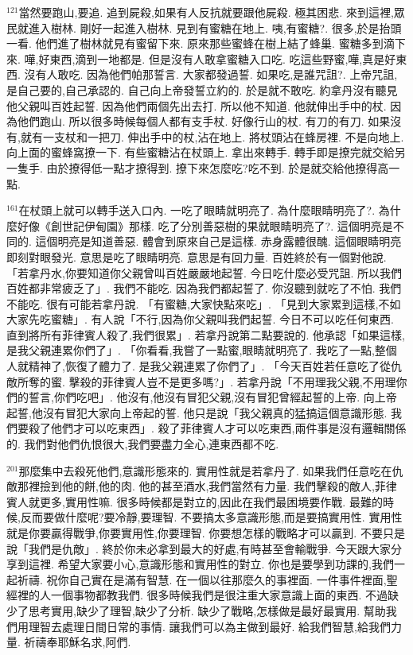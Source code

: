 \documentclass{book}
\begin{document}
$^{121}$當然要跑山,要追.
追到屍殺,如果有人反抗就要跟他屍殺.
極其困悲.
來到這裡,眾民就進入樹林.
剛好一起進入樹林.
見到有蜜糖在地上.
咦,有蜜糖?.
很多,於是抬頭一看.
他們進了樹林就見有蜜留下來.
原來那些蜜蜂在樹上結了蜂巢.
蜜糖多到滴下來.
嘩,好東西,滴到一地都是.
但是沒有人敢拿蜜糖入口吃.
吃這些野蜜,嘩,真是好東西.
沒有人敢吃.
因為他們帕那誓言.
大家都發過誓.
如果吃,是誰咒詛?.
上帝咒詛,是自己要的,自己承認的.
自己向上帝發誓立約的.
於是就不敢吃.
約拿丹沒有聽見他父親叫百姓起誓.
因為他們兩個先出去打.
所以他不知道.
他就伸出手中的杖.
因為他們跑山.
所以很多時候每個人都有支手杖.
好像行山的杖.
有刀的有刀.
如果沒有,就有一支杖和一把刀.
伸出手中的杖,沾在地上.
將杖頭沾在蜂房裡.
不是向地上.
向上面的蜜蜂窩撩一下.
有些蜜糖沾在杖頭上.
拿出來轉手.
轉手即是撩完就交給另一隻手.
由於撩得低一點才撩得到.
撩下來怎麼吃?吃不到.
於是就交給他撩得高一點.

$^{161}$在杖頭上就可以轉手送入口內.
一吃了眼睛就明亮了.
為什麼眼睛明亮了?.
為什麼好像《創世記伊甸園》那樣.
吃了分別善惡樹的果就眼睛明亮了?.
這個明亮是不同的.
這個明亮是知道善惡.
體會到原來自己是這樣.
赤身露體很醜.
這個眼睛明亮即刻對眼發光.
意思是吃了眼睛明亮.
意思是有回力量.
百姓終於有一個對他說.
「若拿丹水,你要知道你父親曾叫百姓嚴嚴地起誓.
今日吃什麼必受咒詛.
所以我們百姓都非常疲乏了」.
我們不能吃.
因為我們都起誓了.
你沒聽到就吃了不怕.
我們不能吃.
很有可能若拿丹說.
「有蜜糖,大家快點來吃」.
「見到大家累到這樣,不如大家先吃蜜糖」.
有人說「不行,因為你父親叫我們起誓.
今日不可以吃任何東西.
直到將所有菲律賓人殺了,我們很累」.
若拿丹說第二點要說的.
他承認「如果這樣,是我父親連累你們了」.
「你看看,我嘗了一點蜜,眼睛就明亮了.
我吃了一點,整個人就精神了,恢復了體力了.
是我父親連累了你們了」.
「今天百姓若任意吃了從仇敵所奪的蜜.
擊殺的菲律賓人豈不是更多嗎?」.
若拿丹說「不用理我父親,不用理你們的誓言,你們吃吧」.
他沒有,他沒有冒犯父親,沒有冒犯曾經起誓的上帝.
向上帝起誓,他沒有冒犯大家向上帝起的誓.
他只是說「我父親真的猛搞這個意識形態.
我們要殺了他們才可以吃東西」.
殺了菲律賓人才可以吃東西,兩件事是沒有邏輯關係的.
我們對他們仇恨很大,我們要盡力全心,連東西都不吃.

$^{201}$那麼集中去殺死他們,意識形態來的.
實用性就是若拿丹了.
如果我們任意吃在仇敵那裡撿到他的餅,他的肉.
他的甚至酒水,我們當然有力量.
我們擊殺的敵人,菲律賓人就更多,實用性嘛.
很多時候都是對立的,因此在我們最困境要作戰.
最難的時候,反而要做什麼呢?要冷靜,要理智.
不要搞太多意識形態,而是要搞實用性.
實用性就是你要贏得戰爭,你要實用性,你要理智.
你要想怎樣的戰略才可以贏到.
不要只是說「我們是仇敵」.
終於你未必拿到最大的好處,有時甚至會輸戰爭.
今天跟大家分享到這裡.
希望大家要小心,意識形態和實用性的對立.
你也是要學到功課的,我們一起祈禱.
祝你自己實在是滿有智慧.
在一個以往那麼久的事裡面.
一件事件裡面,聖經裡的人一個事物都教我們.
很多時候我們是很注重大家意識上面的東西.
不過缺少了思考實用,缺少了理智,缺少了分析.
缺少了戰略,怎樣做是最好最實用.
幫助我們用理智去處理日間日常的事情.
讓我們可以為主做到最好.
給我們智慧,給我們力量.
祈禱奉耶穌名求,阿們.
\newpage
\end{document}

